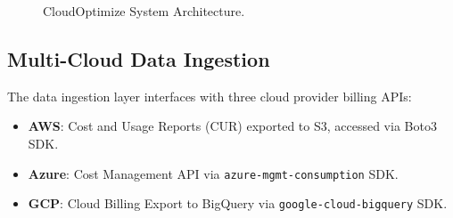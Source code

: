 \documentclass[conference]{IEEEtran}
\begin{document}
\begin{figure}[htbp]
\centering
{}
\caption{CloudOptimize System Architecture.}
\label{fig:architecture}
\end{figure}

\subsection{Multi-Cloud Data Ingestion}

The data ingestion layer interfaces with three cloud provider billing APIs:

\begin{itemize}
    \item \textbf{AWS}: Cost and Usage Reports (CUR) exported to S3, accessed via Boto3 SDK.
    \item \textbf{Azure}: Cost Management API via \texttt{azure-mgmt-consumption} SDK.
    \item \textbf{GCP}: Cloud Billing Export to BigQuery via \texttt{google-cloud-bigquery} SDK.
\end{itemize}
\end{document}
